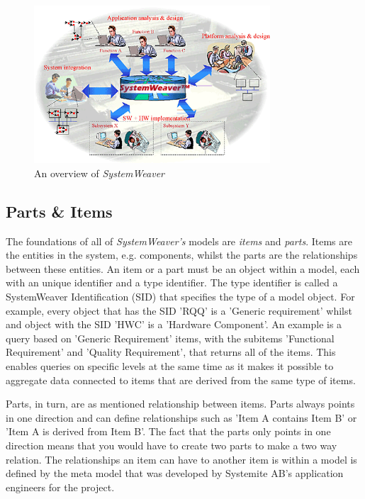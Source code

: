 \begin{figure}[h]
\centering
\includegraphics[width = 250pt, keepaspectratio = true]{fig/systemweaverbild}
\caption{An overview of \emph{SystemWeaver}}
\label{fig:syswovervhej}
\end{figure}
\FloatBarrier

\subsection{Parts \& Items}
The foundations of all of \emph{SystemWeaver's} models are \emph{items} and \emph{parts}. Items are the entities in the system, e.g. components, whilst the parts are the relationships between these entities. %
An item or a part must be an object within a model, each with an unique identifier and a type identifier. 
The type identifier is called a SystemWeaver Identification (SID) that specifies the type of a model object.
For example, every object that has the SID 'RQQ' is a 'Generic requirement' whilst and object with the SID 'HWC' is a 'Hardware Component'. An example is a query based on 'Generic Requirement' items, with the subitems 'Functional Requirement' and 'Quality Requirement', that returns all of the items. This enables queries on specific levels at the same time as it makes it possible to aggregate data connected to items that are derived from the same type of items.

Parts, in turn, are as mentioned relationship between items. 
Parts always points in one direction and can define relationships such as 'Item A contains Item B' or 'Item A is derived from Item B'. The fact that the parts only points in one direction means that you would have to create two parts to make a two way relation.%
The relationships an item can have to another item is within a model is defined by the meta model that was developed by Systemite AB's application engineers for the project.

